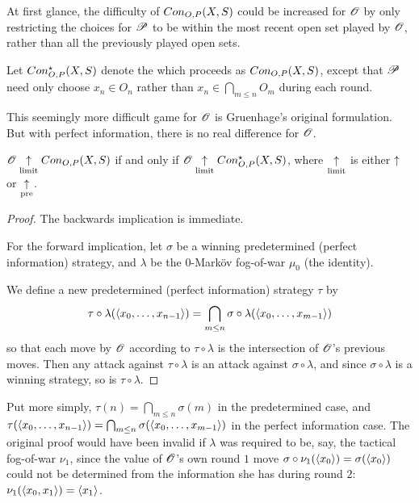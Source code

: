 At first glance, the difficulty of $Con_{O,P}(X,S)$ could be increased for
$\mathscr{O}$ by only restricting the choices for $\mathscr{P}$ to be within the most
recent open set played by $\mathscr{O}$, rather than all the previously played
open sets.

\begin{defn}
  Let $Con_{O,P}^\star(X,S)$ denote the  which
  proceeds as $Con_{O,P}(X,S)$, except that $\mathscr{P}$ need only choose
  $x_n\in O_n$ rather than $x_n\in \bigcap_{m\leq n}O_m$ during each round.
\end{defn}

This seemingly more difficult game for $\mathscr{O}$ is Gruenhage's original
formulation. But with perfect information, there is no real difference for
$\mathscr{O}$.

\begin{prop}\label{propNormalHardCon}
  $\mathscr{O} \underset{\text{limit}}{\uparrow} Con_{O,P}(X,S)$
    if and only if
  $\mathscr{O} \underset{\text{limit}}{\uparrow} Con_{O,P}^\star(X,S)$,
  where $\underset{\text{limit}}{\uparrow}$ is either $\uparrow$ or $\underset{\text{pre}}{\uparrow}$.
\end{prop}

\begin{proof}
  The backwards implication is immediate.

  For the forward implication, let $\sigma$ be a winning predetermined
  (perfect information) strategy, and $\lambda$ be the $0$-Mark\"ov
  fog-of-war $\mu_0$ (the identity).

  We define a new predetermined (perfect information) strategy $\tau$ by
    \[
      \tau\circ\lambda(\langle x_0,\dots,x_{n-1}\rangle)
        =
      \bigcap_{m\leq n}\sigma\circ\lambda(\langle x_0,\dots,x_{m-1}\rangle)
    \]
  so that each move by $\mathscr{O}$ according to $\tau\circ\lambda$ is the
  intersection of $\mathscr{O}$'s previous moves. Then any attack against
  $\tau\circ\lambda$ is an attack against $\sigma\circ\lambda$, and since
  $\sigma\circ\lambda$ is a winning strategy, so is $\tau\circ\lambda$.
\end{proof}

Put more simply, $\tau(n)=\bigcap_{m\leq n}\sigma(m)$ in the predetermined
case, and
$\tau(\langle x_0,\dots,x_{n-1}\rangle)=\bigcap_{m\leq n}\sigma(\langle x_0,\dots,x_{m-1}\rangle)$
in the perfect information case.
The original proof would have been invalid if $\lambda$ was required to be, say,
the tactical fog-of-war $\nu_1$, since the value of $\mathscr{O}$'s own round $1$ move
$\sigma\circ\nu_1(\langle x_0\rangle)=\sigma(\langle x_0\rangle)$
could not be determined from the information she has during round
$2$: $\nu_1(\langle x_0,x_1\rangle)=\langle x_1\rangle$.

